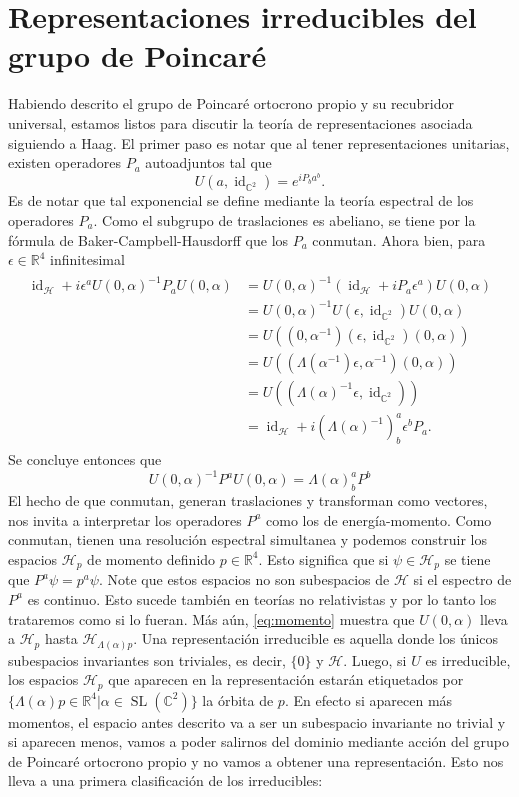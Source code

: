 \documentclass[11pt]{article}
\DeclareMathOperator{\Sl}{SL}
\DeclareMathOperator{\id}{id}
\begin{document}
\section{Representaciones irreducibles del grupo de Poincaré}

Habiendo descrito el grupo de Poincaré ortocrono propio y su recubridor universal, estamos listos para discutir la teoría de representaciones asociada siguiendo a Haag\cite{Haag1992}. El primer paso es notar que al tener representaciones unitarias, existen operadores $P_a$ autoadjuntos tal que
\begin{equation}
U(a,\id_{\mathbb{C}^2})=e^{iP_b a^b}.
\end{equation}
Es de notar que tal exponencial se define mediante la teoría espectral de los operadores $P_a$. Como el subgrupo de traslaciones es abeliano, se tiene por la fórmula de Baker-Campbell-Hausdorff que los $P_a$ conmutan. Ahora bien, para $\epsilon\in\mathbb{R}^4$ infinitesimal
\begin{align}
\begin{split}
\id_\mathcal{H} + i\epsilon^a U(0,\alpha)^{-1}P_a U(0,\alpha) &=U(0,\alpha)^{-1}(\id_\mathcal{H}+iP_a \epsilon^a)U(0,\alpha) \\
&=U(0,\alpha)^{-1}U(\epsilon,\id_{\mathbb{C}^2})U(0,\alpha) \\
&= U((0,\alpha^{-1})(\epsilon,\id_{\mathbb{C}^2})(0,\alpha)) \\
&=U((\Lambda(\alpha^{-1})\epsilon,\alpha^{-1})(0,\alpha)) \\
&=U((\Lambda(\alpha)^{-1} \epsilon, \id_{\mathbb{C}^2})) \\
&=\id_\mathcal{H}+i(\Lambda(\alpha)^{-1})^a_b\epsilon^b P_a.
\end{split}
\end{align}
Se concluye entonces que
\begin{equation}\label{eq:momento}
U(0,\alpha)^{-1}P^a U(0,\alpha) = \Lambda(\alpha)^a_b P^b
\end{equation}
El hecho de que conmutan, generan traslaciones y transforman como vectores, nos invita a interpretar los operadores $P^a$ como los de energía-momento. Como conmutan, tienen una resolución espectral simultanea y podemos construir los espacios $\mathcal{H}_p$ de momento definido $p\in\mathbb{R}^4$. Esto significa que si $\psi\in\mathcal{H}_p$ se tiene que $P^a\psi=p^a \psi$. Note que estos espacios no son subespacios de $\mathcal{H}$ si el espectro de $P^a$ es continuo. Esto sucede también en teorías no relativistas y por lo tanto los trataremos como si lo fueran. Más aún, \eqref{eq:momento} muestra que $U(0,\alpha)$ lleva a $\mathcal{H}_p$ hasta $\mathcal{H}_{\Lambda(\alpha)p}$. Una representación irreducible es aquella donde los únicos subespacios invariantes son triviales, es decir, $\{0\}$ y $\mathcal{H}$. Luego, si $U$ es irreducible, los espacios $\mathcal{H}_p$ que aparecen en la representación estarán etiquetados por $\{\Lambda(\alpha)p\in\mathbb{R}^4|\alpha\in\Sl(\mathbb{C}^2)\}$ la órbita de $p$. En efecto si aparecen más momentos, el espacio antes descrito va a ser un subespacio invariante no trivial y si aparecen menos, vamos a poder salirnos del dominio mediante acción del grupo de Poincaré ortocrono propio y no vamos a obtener una representación. Esto nos lleva a una primera clasificación de los irreducibles:
\end{document}

